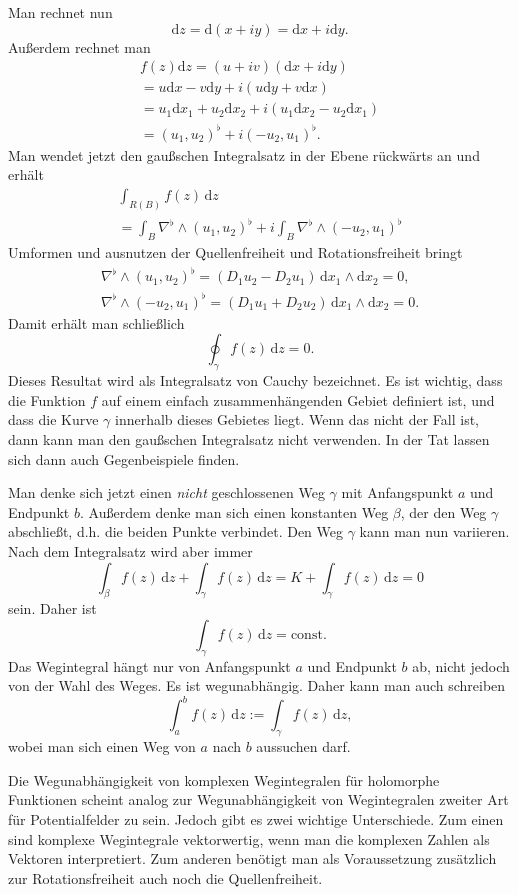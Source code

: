\documentclass[a4paper,10pt,fleqn,twocolumn,twoside]{article}
\begin{document}
Man rechnet nun
\[\mathrm dz = \mathrm d(x+iy) = \mathrm dx+i\mathrm dy.\]
Außerdem rechnet man
\begin{gather*}
f(z)\mathrm dz = (u+iv)(\mathrm dx+i\mathrm dy)\\
= u\mathrm dx-v\mathrm dy+i(u\mathrm dy+v\mathrm dx)\\
= u_1\mathrm dx_1+u_2\mathrm dx_2+i(u_1\mathrm dx_2-u_2\mathrm dx_1)\\
= (u_1,u_2)^\flat + i(-u_2,u_1)^\flat.
\end{gather*}
Man wendet jetzt den gaußschen Integralsatz in der Ebene rückwärts an
und erhält
\begin{gather*}
\int_{R(B)} f(z)\,\mathrm dz\\
= \int_B \nabla^\flat\wedge (u_1,u_2)^\flat
+ i\int_B \nabla^\flat\wedge (-u_2,u_1)^\flat
\end{gather*}
Umformen und ausnutzen der Quellenfreiheit
und Rotationsfreiheit bringt
\begin{gather*}
\nabla^\flat\wedge (u_1,u_2)^\flat
= (D_1u_2-D_2u_1)\,\mathrm dx_1\wedge\mathrm dx_2= 0,\\
\nabla^\flat\wedge (-u_2,u_1)^\flat = (D_1u_1+D_2u_2)\,
\mathrm dx_1\wedge\mathrm dx_2 = 0.
\end{gather*}
Damit erhält man schließlich
\[\oint_\gamma f(z)\,\mathrm dz = 0.\]
Dieses Resultat wird als Integralsatz von Cauchy bezeichnet.
Es ist wichtig, dass die Funktion $f$ auf einem einfach
zusammenhängenden Gebiet definiert ist, und dass die Kurve $\gamma$
innerhalb dieses Gebietes liegt. Wenn das nicht der Fall ist, dann
kann man den gaußschen Integralsatz nicht verwenden. In der Tat lassen
sich dann auch Gegenbeispiele finden.

Man denke sich jetzt einen \textit{nicht} geschlossenen Weg $\gamma$
mit Anfangspunkt $a$ und Endpunkt $b$. Außerdem denke man sich
einen konstanten Weg $\beta$, der den Weg $\gamma$
abschließt, d.h. die beiden Punkte verbindet. Den Weg $\gamma$
kann man nun variieren. Nach dem Integralsatz wird aber immer
\[\int_{\beta} f(z)\,\mathrm dz+\int_\gamma f(z)\,\mathrm dz
=K+\int_\gamma f(z)\,\mathrm dz=0\]
sein. Daher ist
\[\int_\gamma f(z)\,\mathrm dz=\mathrm{const}.\]
Das Wegintegral hängt nur von Anfangspunkt $a$ und Endpunkt $b$
ab, nicht jedoch von der Wahl des Weges. Es ist wegunabhängig. Daher
kann man auch schreiben
\[\int_a^b f(z)\,\mathrm dz:=\int_\gamma f(z)\,\mathrm dz,\]
wobei man sich einen Weg von $a$ nach $b$ aussuchen darf.

Die Wegunabhängigkeit von komplexen Wegintegralen für holomorphe
Funktionen scheint analog zur Wegunabhängigkeit von Wegintegralen
zweiter Art für Potentialfelder zu sein. Jedoch gibt es zwei wichtige
Unterschiede. Zum einen sind komplexe Wegintegrale vektorwertig, wenn
man die komplexen Zahlen als Vektoren interpretiert. Zum anderen
benötigt man als Voraussetzung zusätzlich zur Rotationsfreiheit
auch noch die Quellenfreiheit.
\end{document}
